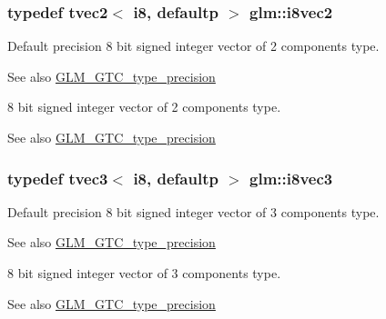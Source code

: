 \subsubsection[{i8vec2}]{\setlength{\rightskip}{0pt plus 5cm}typedef tvec2$<$ i8, defaultp $>$ {\bf glm\+::i8vec2}}\label{group__gtc__type__precision_ga277312370b6155b37dbf2a6954c42915}
Default precision 8 bit signed integer vector of 2 components type. \begin{DoxySeeAlso}{See also}
\hyperlink{group__gtc__type__precision}{G\+L\+M\+\_\+\+G\+T\+C\+\_\+type\+\_\+precision}
\end{DoxySeeAlso}
8 bit signed integer vector of 2 components type. \begin{DoxySeeAlso}{See also}
\hyperlink{group__gtc__type__precision}{G\+L\+M\+\_\+\+G\+T\+C\+\_\+type\+\_\+precision} 
\end{DoxySeeAlso}
\hypertarget{group__gtc__type__precision_ga97a6cae79db311cdd47c4e88a5855987}{}
\subsubsection[{i8vec3}]{\setlength{\rightskip}{0pt plus 5cm}typedef tvec3$<$ i8, defaultp $>$ {\bf glm\+::i8vec3}}\label{group__gtc__type__precision_ga97a6cae79db311cdd47c4e88a5855987}
Default precision 8 bit signed integer vector of 3 components type. \begin{DoxySeeAlso}{See also}
\hyperlink{group__gtc__type__precision}{G\+L\+M\+\_\+\+G\+T\+C\+\_\+type\+\_\+precision}
\end{DoxySeeAlso}
8 bit signed integer vector of 3 components type. \begin{DoxySeeAlso}{See also}
\hyperlink{group__gtc__type__precision}{G\+L\+M\+\_\+\+G\+T\+C\+\_\+type\+\_\+precision} 
\end{DoxySeeAlso}
\hypertarget{group__gtc__type__precision_gafbf10a778016eba57d44beb585f2dc49}{}
